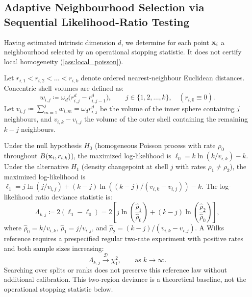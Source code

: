 \subsection{Adaptive Neighbourhood Selection via Sequential
Likelihood-Ratio Testing}
\label{subsec:adaptive_kstar}

Having estimated intrinsic dimension $d$, we determine for each
point $\mathbf{x}_i$ a neighbourhood selected by an operational stopping
statistic. It does not certify local homogeneity (\cref{ass:local_poisson}).

Let $r_{i,1} < r_{i,2} < \dots < r_{i,k}$ denote ordered
nearest-neighbour Euclidean distances. Concentric shell volumes are defined as:
\begin{equation}
  w_{i,j} \coloneqq \omega_d \bigl(r_{i,j}^d - r_{i,j-1}^d\bigr),
  \qquad j \in \{1, 2, \dots, k\}, \quad (r_{i,0} \equiv 0).
  \label{eq:shell_volume_def}
\end{equation}
Let $v_{i,j} \coloneqq \sum_{m=1}^j w_{i,m} = \omega_d r_{i,j}^d$ be
the volume of the inner sphere containing $j$ neighbours, and
$v_{i,k} - v_{i,j}$ the volume of the outer shell containing the
remaining $k - j$ neighbours.

\begin{theorem}
  \label{thm:wilks_deviance}
  Under the null hypothesis $H_0$ (homogeneous Poisson process with
  rate $\rho_0$ throughout $B(\mathbf{x}_i, r_{i,k})$), the maximized
  log-likelihood is $\ell_0 = k \ln(k/v_{i,k}) - k$. Under the
  alternative $H_1$ (density changepoint at shell $j$ with rates
  $\rho_1 \ne \rho_2$), the maximized log-likelihood is $\ell_1 = j
  \ln(j/v_{i,j}) + (k-j)\ln((k-j)/(v_{i,k}-v_{i,j})) - k$. The
  log-likelihood ratio deviance statistic is:
  \begin{equation}
    \Lambda_{k,j} \coloneqq 2(\ell_1 - \ell_0) = 2 \left[ j
      \ln\left( \frac{\hat{\rho}_1}{\hat{\rho}_0} \right) + (k - j)
    \ln\left( \frac{\hat{\rho}_2}{\hat{\rho}_0} \right) \right],
    \label{eq:deviance_statistic}
  \end{equation}
  where $\hat{\rho}_0 = k/v_{i,k}$, $\hat{\rho}_1 = j/v_{i,j}$, and
  $\hat{\rho}_2 = (k-j)/(v_{i,k} - v_{i,j})$. A Wilks reference
  \parencite{wilks1938} requires a prespecified regular two-rate
  experiment with positive rates and both sample sizes increasing:
  \begin{equation}
    \Lambda_{k,j} \xrightarrow{\mathcal{D}} \chi^2_1, \qquad
    \text{as } k \to \infty.
    \label{eq:wilks_convergence}
  \end{equation}
  Searching over splits or ranks does not preserve this reference law
  without additional calibration. This two-region deviance is a
  theoretical baseline, not the operational stopping statistic below.
\end{theorem}


